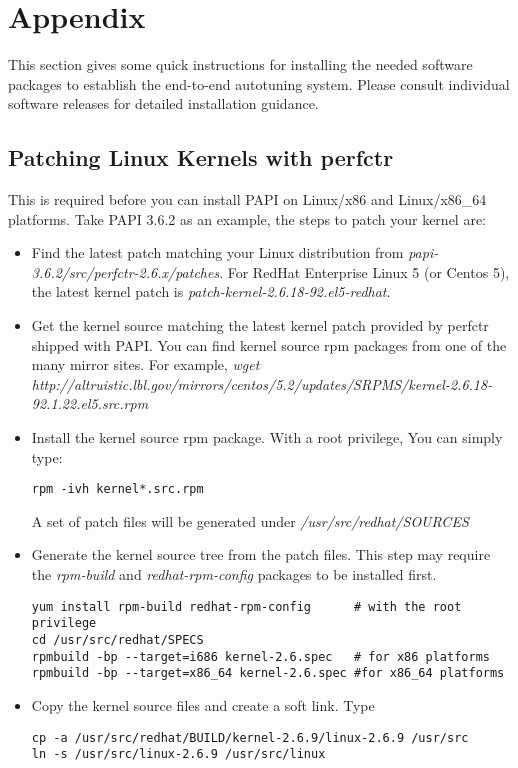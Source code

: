 \section{Appendix}
This section gives some quick instructions for installing the needed software packages to establish the end-to-end autotuning system. 
Please consult individual software releases for detailed installation guidance. 

\subsection{Patching Linux Kernels with perfctr}
This is required before you can install PAPI on Linux/x86 and Linux/x86\_64 platforms. 
Take PAPI 3.6.2 as an example, the steps to patch your kernel are:
\begin{itemize}
\item Find the latest patch matching your Linux distribution from \textit{papi-3.6.2/src/perfctr-2.6.x/patches}. For RedHat Enterprise Linux 5 (or Centos 5), the latest kernel patch is \textit{patch-kernel-2.6.18-92.el5-redhat}.
\item Get the kernel source matching the latest kernel patch provided by perfctr shipped with PAPI. You can find kernel source rpm packages from one of the many mirror sites. For example, 
\textit{wget http://altruistic.lbl.gov/mirrors/centos/5.2/updates/SRPMS/kernel-2.6.18-92.1.22.el5.src.rpm}
\item Install the kernel source rpm package. With a root privilege, You can simply type: 
\begin{verbatim}
rpm -ivh kernel*.src.rpm
\end{verbatim}
A set of patch files will be generated under \textit{/usr/src/redhat/SOURCES}
\item Generate the kernel source tree from the patch files. 
This step may require the \textit{rpm-build} and \textit{redhat-rpm-config} packages to be installed first. 
\begin{verbatim}
yum install rpm-build redhat-rpm-config      # with the root privilege 
cd /usr/src/redhat/SPECS
rpmbuild -bp --target=i686 kernel-2.6.spec   # for x86 platforms    
rpmbuild -bp --target=x86_64 kernel-2.6.spec #for x86_64 platforms
\end{verbatim}

\item Copy the kernel source files and create a soft link. Type 
\begin{verbatim}
cp -a /usr/src/redhat/BUILD/kernel-2.6.9/linux-2.6.9 /usr/src
ln -s /usr/src/linux-2.6.9 /usr/src/linux
\end{verbatim}


\end{itemize}
